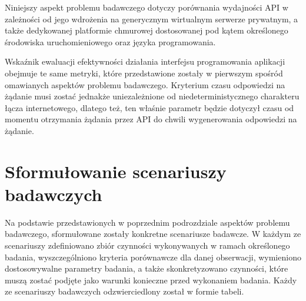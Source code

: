 Niniejszy aspekt problemu badawczego dotyczy porównania wydajności API w zależności od jego wdrożenia na generycznym wirtualnym serwerze prywatnym, a także dedykowanej platformie chmurowej dostosowanej pod kątem określonego środowiska uruchomieniowego oraz języka programowania.

Wskaźnik ewaluacji efektywności działania interfejsu programowania aplikacji obejmuje te same metryki, które przedstawione zostały w pierwszym spośród omawianych aspektów problemu badawczego. Kryterium czasu odpowiedzi na żądanie musi zostać jednakże uniezależnione od niedeterministycznego charakteru łącza internetowego, dlatego też, ten właśnie parametr będzie dotyczył czasu od momentu otrzymania żądania przez API do chwili wygenerowania odpowiedzi na żądanie.
\section{Sformułowanie scenariuszy badawczych}
\label{sec:scenariusze-badawcze}
Na podstawie przedstawionych w poprzednim podrozdziale aspektów problemu badawczego, sformułowane zostały konkretne scenariusze badawcze. W każdym ze scenariuszy zdefiniowano zbiór czynności wykonywanych w ramach określonego badania, wyszczególniono kryteria porównawcze dla danej obserwacji, wymieniono dostosowywalne parametry badania, a także skonkretyzowano czynności, które muszą zostać podjęte jako warunki konieczne przed wykonaniem badania. Każdy ze scenariuszy badawczych odzwierciedlony został w formie tabeli.

